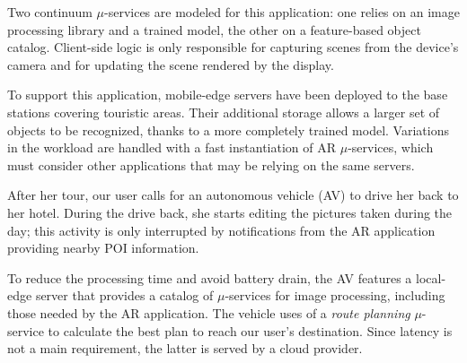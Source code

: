 Two continuum $\mu$-services are modeled for this application: one relies on an image processing library and a trained model, the other on a feature-based object catalog. Client-side logic is only responsible for capturing scenes from the device's camera and for updating the scene rendered by the display.


To support this application, mobile-edge servers have been deployed to the base stations covering touristic areas. Their additional storage allows a larger set of objects to be recognized, thanks to a more completely trained model. Variations in the workload are handled with a fast instantiation of AR $\mu$-services, which must consider other applications that may be relying on the same servers.


After her tour, our user calls for an autonomous vehicle (AV) to drive her back to her hotel. During the drive back, she starts editing the pictures taken during the day; this activity is only interrupted by notifications from the AR application providing nearby POI information. 

To reduce the processing time and avoid battery drain, the AV features a local-edge server that provides a catalog of $\mu$-services for image processing, including those needed by the AR application. The vehicle uses of a \textit{route planning} $\mu$-service
to calculate the best plan to reach our user's destination. Since latency is not a main requirement, the latter is served by a cloud provider.




